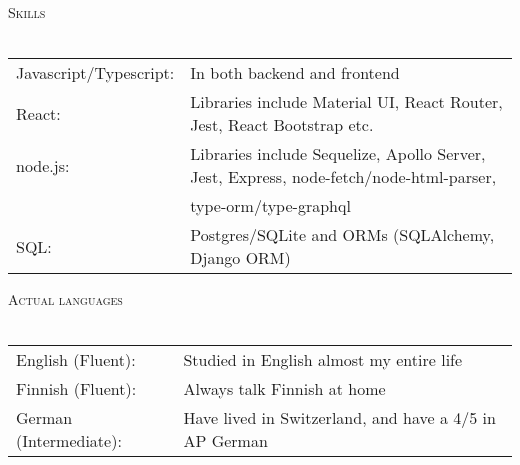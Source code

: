 \documentclass[a4paper]{article}
\newcommand{\lineunder} {
    \vspace*{-8pt} \\
    \hspace*{-18pt} \hrulefill \\
}
\newcommand{\header} [1] {
    {\hspace*{-18pt}\vspace*{6pt} \textsc{#1}}
    \vspace*{-6pt} \lineunder
}
\begin{document}
\header{Skills}
\begin{tabular}{ l l }
	Javascript/Typescript: & In both backend and frontend                                                           \\
	React:                 & Libraries include Material UI, React Router, Jest, React Bootstrap etc.                \\
	node.js:               & Libraries include Sequelize, Apollo Server, Jest, Express, node-fetch/node-html-parser,   \\ 
  & type-orm/type-graphql \\
	SQL:                   & Postgres/SQLite and ORM\textquotesingle{}s (SQLAlchemy, Django ORM)         \\
\end{tabular}
\vspace{2mm}

\header{Actual languages}
\begin{tabular}{ l l }
  English (Fluent): & Studied in English almost my entire life \\
  Finnish (Fluent): & Always talk Finnish at home                \\
  German (Intermediate): & Have lived in Switzerland, and have a 4/5 in AP German \\
\end{tabular}
\vspace{2mm}
\end{document}
